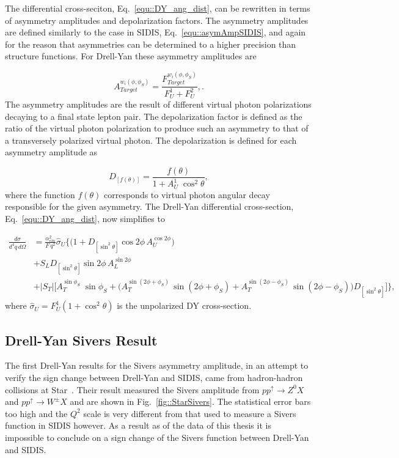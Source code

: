 The differential cross-seciton, Eq.~\ref{equ::DY_ang_dist}, can be rewritten in
terms of asymmetry amplitudes and depolarization factors.  The asymmetry
amplitudes are defined similarly to the case in SIDIS,
Eq.~\ref{equ::asymAmpSIDIS}, and again for the reason that asymmetries can be
determined to a higher precision than structure functions.  For Drell-Yan these
asymmetry amplitudes are

\begin{equation}
  A^{w_i(\phi, \phi_S)}_{Target} = \frac{F^{w_i(\phi,
      \phi_S)}_{Target}}{F_{U}^1+F_{U}^2},
  \label{equ::asymAmpDY}.
\end{equation}
\noindent
The asymmetry amplitudes are the result of different virtual photon
polarizations decaying to a final state lepton pair.  The depolarization factor
is defined as the ratio of the virtual photon polarization to produce such an
asymmetry to that of a transversely polarized virtual photon.  The
depolarization is defined for each asymmetry amplitude as

\begin{equation}
  D_{[f(\theta)]} = \frac{f(\theta)}{1+A_U^1\;\cos^2\theta},
\end{equation}
\noindent
where the function $f(\theta)$ corresponds to virtual photon angular decay
responsible for the given asymmetry.  The Drell-Yan differential cross-section,
Eq.~\ref{equ::DY_ang_dist}, now simplifies to~\cite{AKotzininaNote}

\begin{align}
  \frac{d\sigma}{d^4 q \, d \Omega} &=
  \frac{\alpha_{em}^2}{F \, q^2}\hat{\sigma}_U
  \Big \{ \Big(1 + D_{[\sin^2 \theta]} \cos 2\phi \, A_{U}^{\cos 2\phi} \Big)
 \nonumber \\
 &+ S_{L} D_{[\sin^2 \theta]} \sin 2\phi \, A_{L}^{\sin 2\phi}
   \nonumber \\
   &+ |S_{T}|
   \Big[A_{T}^{\sin \phi_S}\;\sin \phi_{S} 
     + \Big( A_{T}^{\sin (2\phi +\phi_S)}\, \sin(2\phi+\phi_S) +
     A_{T}^{\sin (2\phi - \phi_S)}\, \sin(2\phi-\phi_S) \Big)D_{[\sin ^2\theta]}
     \Big ]
   \Big \},
\end{align}
\noindent
where $\hat{\sigma}_U = F^1_U (1+\cos^2\theta)$ is the unpolarized DY
cross-section.

\subsection{Drell-Yan Sivers Result}
The first Drell-Yan results for the Sivers asymmetry amplitude, in an attempt to
verify the sign change between Drell-Yan and SIDIS, came from hadron-hadron
collisions at Star~\cite{PhysRevLett.116.132301}.  Their result measured the
Sivers amplitude from $pp^{\uparrow} \rightarrow Z^0X$ and $pp^{\uparrow}
\rightarrow W^{\pm}X$ and are shown in Fig.~\ref{fig::StarSivers}.  The
statistical error bars too high and the $Q^2$ scale is very different from that
used to measure a Sivers function in SIDIS however.  As a result as of the data
of this thesis it is impossible to conclude on a sign change of the Sivers
function between Drell-Yan and SIDIS.

